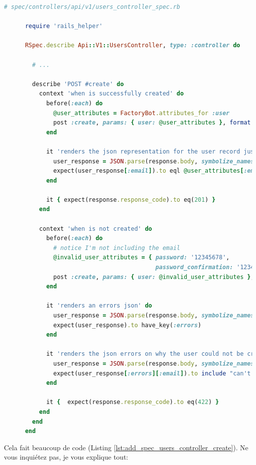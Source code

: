 \documentclass[]{report}
\begin{document}
      \begin{scriptsize}
      \begin{lstlisting}[language=ruby, caption={Ajout les tests de création des utilisateurs}, label={lst:add_spec_users_controller_create}]
      # spec/controllers/api/v1/users_controller_spec.rb

      require 'rails_helper'

      RSpec.describe Api::V1::UsersController, type: :controller do

        # ...

        describe 'POST #create' do
          context 'when is successfully created' do
            before(:each) do
              @user_attributes = FactoryBot.attributes_for :user
              post :create, params: { user: @user_attributes }, format: :json
            end

            it 'renders the json representation for the user record just created' do
              user_response = JSON.parse(response.body, symbolize_names: true)
              expect(user_response[:email]).to eql @user_attributes[:email]
            end

            it { expect(response.response_code).to eq(201) }
          end

          context 'when is not created' do
            before(:each) do
              # notice I'm not including the email
              @invalid_user_attributes = { password: '12345678',
                                           password_confirmation: '12345678' }
              post :create, params: { user: @invalid_user_attributes }, format: :json
            end

            it 'renders an errors json' do
              user_response = JSON.parse(response.body, symbolize_names: true)
              expect(user_response).to have_key(:errors)
            end

            it 'renders the json errors on why the user could not be created' do
              user_response = JSON.parse(response.body, symbolize_names: true)
              expect(user_response[:errors][:email]).to include "can't be blank"
            end

            it {  expect(response.response_code).to eq(422) }
          end
        end
      end
      \end{lstlisting}
      \end{scriptsize}

      Cela fait beaucoup de code (Listing \ref{lst:add_spec_users_controller_create}). Ne vous inquiétez pas, je vous explique tout:
\end{document}
